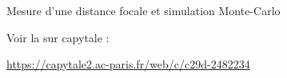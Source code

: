
\begin{exo}[PC][3][python]{Mesure d'une distance focale et simulation Monte-Carlo}

Voir la  sur capytale :
\begin{center}
	\href{https://capytale2.ac-paris.fr/web/c/c29d-2482234}{https://capytale2.ac-paris.fr/web/c/c29d-2482234}
\end{center}






\end{exo}
